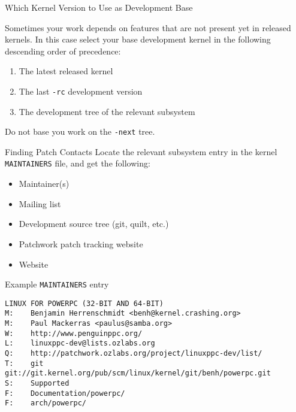 \documentclass{beamer}
\begin{document}
\begin{frame}{Which Kernel Version to Use as Development Base}

  Sometimes your work depends on features that are not present yet in
  released kernels. In this case select your base development kernel
  in the following descending order of precedence:

  \begin{enumerate}
  \item The latest released kernel
  \item The last \texttt{-rc} development version
  \item The development tree of the relevant subsystem
  \end{enumerate}

  Do not base you work on the \texttt{-next} tree.
\end{frame}

\begin{frame}[fragile]{Finding Patch Contacts}
  Locate the relevant subsystem entry in the kernel
  \texttt{MAINTAINERS} file, and get the following:
  \begin{itemize}
  \item Maintainer(s)
  \item Mailing list
  \item Development source tree (git, quilt, etc.)
  \item Patchwork patch tracking website
  \item Website
  \end{itemize}

  \begin{exampleblock}{Example \texttt{MAINTAINERS} entry}
    \begin{Verbatim}[fontsize=\scriptsize]
LINUX FOR POWERPC (32-BIT AND 64-BIT)
M:    Benjamin Herrenschmidt <benh@kernel.crashing.org>
M:    Paul Mackerras <paulus@samba.org>
W:    http://www.penguinppc.org/
L:    linuxppc-dev@lists.ozlabs.org
Q:    http://patchwork.ozlabs.org/project/linuxppc-dev/list/
T:    git git://git.kernel.org/pub/scm/linux/kernel/git/benh/powerpc.git
S:    Supported
F:    Documentation/powerpc/
F:    arch/powerpc/
    \end{Verbatim}
  \end{exampleblock}
\end{frame}
\end{document}
